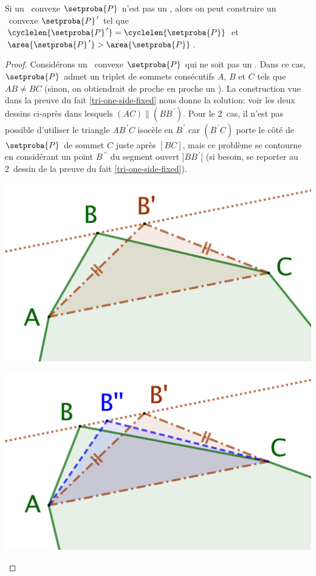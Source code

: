 

\begin{fact} \label{iso-poly}
	Si un \ngone\ convexe $\setproba{P}$ n'est pas un \nequi, alors on peut construire un \ngone\ convexe $\setproba{P}^{\,\prime}$ tel que
	$\cyclelen{\setproba{P}^{\,\prime}} = \cyclelen{\setproba{P}}$
	et
	$\area{\setproba{P}^{\,\prime}} > \area{\setproba{P}}$.
\end{fact}


\begin{proof}
	Considérons un \ngone\ convexe $\setproba{P}$ qui ne soit pas un \nequi.
	Dans ce cas, $\setproba{P}$ admet un triplet de sommets consécutifs $A$, $B$ et $C$ tels que $AB \neq BC$ (sinon, on obtiendrait de proche en proche un \nequi).
	La construction vue dans la preuve du fait \ref{tri-one-side-fixed} nous donne la solution: voir les deux dessins ci-après dans lesquels $(AC) \parallel (BB^{\,\prime})$.
	Pour le 2\ieme\ cas, il n'est pas possible d'utiliser le triangle $AB^{\,\prime}C$ isocèle en $B^{\,\prime}$ car $(B^{\,\prime}C)$ porte le côté de $\setproba{P}$ de sommet $C$ juste après $[BC]$, mais ce problème se contourne en considérant un point $B^{\,\prime\prime}$ du segment ouvert $]BB^{\,\prime}[$ (si besoin, se reporter au 2\ieme\ dessin de la preuve du fait \ref{tri-one-side-fixed}).
	\begin{multicols}{2}
		\centering

		\includegraphics[scale=.4]{content/polygon/sol-is/not-iso-OK.png}

		\includegraphics[scale=.4]{content/polygon/sol-is/not-iso-KO.png}
	\end{multicols}


\end{proof}
